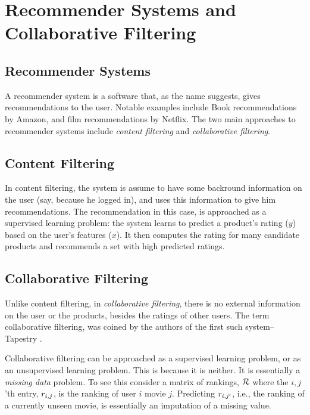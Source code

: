 \chapter{Recommender Systems and Collaborative Filtering}
\label{sec:collaborative_filtering}


\section{Recommender Systems}

A recommender system is a software that, as the name suggests, gives recommendations to the user. 
Notable examples include Book recommendations by Amazon, and film recommendations by Netflix.
The two main approaches to recommender systems include \emph{content filtering} and \emph{collaborative filtering}.



\section{Content Filtering}

In content filtering, the system is assume to have some backround information on the user (say, because he logged in), and uses
this information to give him recommendations.
The recommendation in this case, is approached as a supervised learning problem: 
the system learns to predict a product's rating ($y$) based on the user's features ($x$).
It then computes the rating for many candidate products and recommends a set with high predicted ratings.



\section{Collaborative Filtering}

Unlike content filtering, in \emph{collaborative filtering}, there is no external information on the user or the products, besides the ratings of other users. 
The term collaborative filtering, was coined by the authors of the first such system-- Tapestry \citep{goldberg_using_1992}. 

Collaborative filtering can be approached as a supervised learning problem, or as an unsupervised learning problem. This is because it is neither. 
It is essentially a \emph{missing data} problem.
To see this consider a matrix of rankings, $\mathcal{R}$ where the $i,j$'th entry, $r_{i,j}$, is the ranking of user $i$ movie $j$. 
Predicting $r_{i,j'}$, i.e., the ranking of a currently unseen movie, is essentially an imputation of a missing value.


